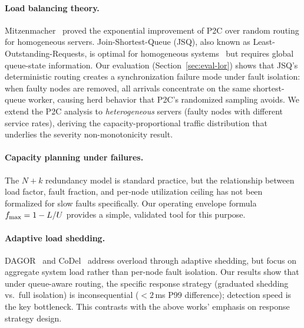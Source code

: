 \paragraph{Load balancing theory.}
Mitzenmacher~\cite{mitzenmacher2001power} proved the exponential
improvement of P2C over random routing for homogeneous servers.
Join-Shortest-Queue (JSQ), also known as Least-Outstanding-Requests,
is optimal for homogeneous systems~\cite{winston1977optimality} but
requires global queue-state information. Our evaluation
(Section~\ref{sec:eval-lor}) shows that JSQ's deterministic routing
creates a synchronization failure mode under fault isolation: when
faulty nodes are removed, all arrivals concentrate on the same
shortest-queue worker, causing herd behavior that P2C's randomized
sampling avoids. We extend the P2C analysis to \emph{heterogeneous}
servers (faulty nodes with different service rates), deriving the
capacity-proportional traffic distribution that underlies the severity
non-monotonicity result.

\paragraph{Capacity planning under failures.}
The $N+k$ redundancy model is standard practice, but the relationship
between load factor, fault fraction, and per-node utilization ceiling
has not been formalized for slow faults specifically. Our operating
envelope formula $f_{\max} = 1 - L/U$ provides a simple, validated tool
for this purpose.

\paragraph{Adaptive load shedding.}
DAGOR~\cite{zhang2021dagor} and CoDel~\cite{nichols2012codel} address
overload through adaptive shedding, but focus on aggregate system load
rather than per-node fault isolation. Our results show that under
queue-aware routing, the specific response strategy (graduated
shedding vs.\ full isolation) is inconsequential ($< 2$\,ms P99
difference); detection speed is the key bottleneck. This contrasts
with the above works' emphasis on response strategy design.
